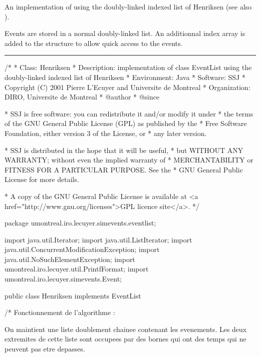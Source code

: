 
An implementation of  using the doubly-linked
indexed list of Henriksen \cite{sKIN86a} (see also \cite[p. 207]{sFIS01a}).

Events are stored in a normal doubly-linked list. An additionnal
index array is added to the structure to allow quick access to the
events.

\bigskip\hrule

\begin{code}
\begin{hide}
/*
 * Class:        Henriksen
 * Description:  implementation of class EventList using the doubly-linked
                 indexed list of Henriksen
 * Environment:  Java
 * Software:     SSJ 
 * Copyright (C) 2001  Pierre L'Ecuyer and Universite de Montreal
 * Organization: DIRO, Universite de Montreal
 * @author       
 * @since

 * SSJ is free software: you can redistribute it and/or modify it under
 * the terms of the GNU General Public License (GPL) as published by the
 * Free Software Foundation, either version 3 of the License, or
 * any later version.

 * SSJ is distributed in the hope that it will be useful,
 * but WITHOUT ANY WARRANTY; without even the implied warranty of
 * MERCHANTABILITY or FITNESS FOR A PARTICULAR PURPOSE.  See the
 * GNU General Public License for more details.

 * A copy of the GNU General Public License is available at
   <a href="http://www.gnu.org/licenses">GPL licence site</a>.
 */
\end{hide}
package umontreal.iro.lecuyer.simevents.eventlist;\begin{hide}

import java.util.Iterator;
import java.util.ListIterator;
import java.util.ConcurrentModificationException;
import java.util.NoSuchElementException;
import umontreal.iro.lecuyer.util.PrintfFormat;
import umontreal.iro.lecuyer.simevents.Event;
\end{hide}

public class Henriksen implements EventList \begin{hide} {
   /*
     Fonctionnement de l'algorithme :

     On maintient une liste doublement chainee contenant les evenements.
     Les deux extremites de cette liste sont occupees par des bornes qui
     ont des temps qui ne peuvent pas etre depasses.

}
\end{hide}
\end{code}
